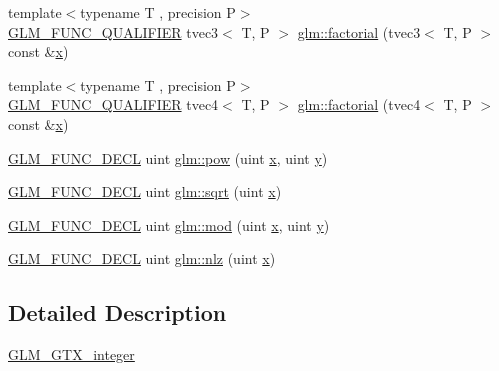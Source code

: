 \begin{DoxyCompactItemize}
\item 
{\footnotesize template$<$typename T , precision P$>$ }\\\mbox{\hyperlink{setup_8hpp_a33fdea6f91c5f834105f7415e2a64407}{G\+L\+M\+\_\+\+F\+U\+N\+C\+\_\+\+Q\+U\+A\+L\+I\+F\+I\+ER}} tvec3$<$ T, P $>$ \mbox{\hyperlink{namespaceglm_ab41ee15497a5efb175292e635daa4918}{glm\+::factorial}} (tvec3$<$ T, P $>$ const \&\mbox{\hyperlink{glad_8h_a92d0386e5c19fb81ea88c9f99644ab1d}{x}})
\item 
{\footnotesize template$<$typename T , precision P$>$ }\\\mbox{\hyperlink{setup_8hpp_a33fdea6f91c5f834105f7415e2a64407}{G\+L\+M\+\_\+\+F\+U\+N\+C\+\_\+\+Q\+U\+A\+L\+I\+F\+I\+ER}} tvec4$<$ T, P $>$ \mbox{\hyperlink{namespaceglm_a521766929c175b805ff9856d23c4e36c}{glm\+::factorial}} (tvec4$<$ T, P $>$ const \&\mbox{\hyperlink{glad_8h_a92d0386e5c19fb81ea88c9f99644ab1d}{x}})
\item 
\mbox{\hyperlink{setup_8hpp_ab2d052de21a70539923e9bcbf6e83a51}{G\+L\+M\+\_\+\+F\+U\+N\+C\+\_\+\+D\+E\+CL}} uint \mbox{\hyperlink{group__gtx__integer_gaa8229e850c3cc4ad83492fe390ada044}{glm\+::pow}} (uint \mbox{\hyperlink{glad_8h_a92d0386e5c19fb81ea88c9f99644ab1d}{x}}, uint \mbox{\hyperlink{glad_8h_a66ddd433d2cacfe27f5906b7e86faeed}{y}})
\item 
\mbox{\hyperlink{setup_8hpp_ab2d052de21a70539923e9bcbf6e83a51}{G\+L\+M\+\_\+\+F\+U\+N\+C\+\_\+\+D\+E\+CL}} uint \mbox{\hyperlink{group__gtx__integer_ga457e9efca8339bf918d319e9c55f7c8f}{glm\+::sqrt}} (uint \mbox{\hyperlink{glad_8h_a92d0386e5c19fb81ea88c9f99644ab1d}{x}})
\item 
\mbox{\hyperlink{setup_8hpp_ab2d052de21a70539923e9bcbf6e83a51}{G\+L\+M\+\_\+\+F\+U\+N\+C\+\_\+\+D\+E\+CL}} uint \mbox{\hyperlink{group__gtx__integer_gab8f9ec0ca93ca90669434224818f0750}{glm\+::mod}} (uint \mbox{\hyperlink{glad_8h_a92d0386e5c19fb81ea88c9f99644ab1d}{x}}, uint \mbox{\hyperlink{glad_8h_a66ddd433d2cacfe27f5906b7e86faeed}{y}})
\item 
\mbox{\hyperlink{setup_8hpp_ab2d052de21a70539923e9bcbf6e83a51}{G\+L\+M\+\_\+\+F\+U\+N\+C\+\_\+\+D\+E\+CL}} uint \mbox{\hyperlink{group__gtx__integer_gacbe62fd2384464c16ea30ecc4defc11c}{glm\+::nlz}} (uint \mbox{\hyperlink{glad_8h_a92d0386e5c19fb81ea88c9f99644ab1d}{x}})
\end{DoxyCompactItemize}


\subsection{Detailed Description}
\mbox{\hyperlink{group__gtx__integer}{G\+L\+M\+\_\+\+G\+T\+X\+\_\+integer}} 